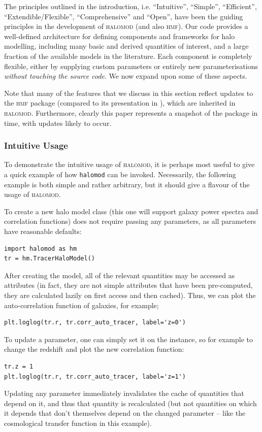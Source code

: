 \documentclass[5p,aas_macros]{elsarticle}
\newcommand{\halomod}{\textsc{halomod}}
\begin{document}
The principles outlined in the introduction, i.e.  ``Intuitive'', ``Simple'', ``Efficient'', ``Extendible/Flexible'', ``Comprehensive'' and ``Open'', have been the guiding principles in the development of \textsc{halomod} (and also \textsc{hmf}). Our code provides a well-defined architecture for defining components and frameworks for halo modelling, including many basic and derived quantities of interest, and a large fraction of the available models in the literature. Each component is completely flexible, either by supplying custom parameters or entirely new parameterisations \textit{without touching the source code}. We now expand upon some of these aspects.

Note that many of the features that we discuss in this section reflect updates to the \textsc{hmf} package (compared to its presentation in \citet{Murray2013}), which are inherited in \textsc{halomod}. Furthermore, clearly this paper represents a snapshot of the package in time, with updates likely to occur. 

\subsubsection{Intuitive Usage}
\label{sec:halomod:overview:usage}
To demonstrate the intuitive usage of \halomod, it is perhaps most useful to give a quick example of how \verb|halomod| can be invoked. 
Necessarily, the following example is both simple and rather arbitrary, but it should give a flavour of the usage of \halomod.

To create a new halo model class (this one will support galaxy power spectra and correlation functions) does not require passing any parameters, as all parameters have reasonable defaults:
\begin{verbatim}
import halomod as hm
tr = hm.TracerHaloModel()
\end{verbatim}

After creating the model, all of the relevant quantities may be accessed as attributes (in fact, they are not simple attributes that have been pre-computed, they are calculated lazily on first access and then cached).
Thus, we can plot the auto-correlation function of galaxies, for example; 
\begin{verbatim}
plt.loglog(tr.r, tr.corr_auto_tracer, label='z=0')
\end{verbatim}
To update a parameter, one can simply set it on the instance, so for example to change the redshift and plot the new correlation function:
\begin{verbatim}
tr.z = 1
plt.loglog(tr.r, tr.corr_auto_tracer, label='z=1')
\end{verbatim}
Updating any parameter immediately invalidates the cache of quantities that depend on it, and thus that quantity is recalculated (but not quantities on which it depends that don't themselves depend on the changed parameter -- like the cosmological transfer function in this example). 
\end{document}
